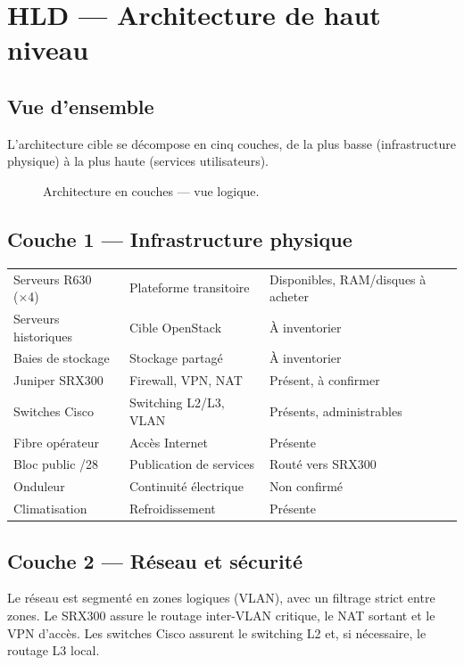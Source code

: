 \chapter{HLD — Architecture de haut niveau}
\label{chap:hld}

\section{Vue d'ensemble}
L'architecture cible se décompose en cinq couches, de la plus basse (infrastructure physique) à la plus haute (services utilisateurs).

\begin{figure}[H]
\centering\vspace{2pt}

\caption{Architecture en couches — vue logique.}
\label{fig:archi-layers}
\end{figure}

\section{Couche 1 — Infrastructure physique}
\begin{xltabular}{\textwidth}{@{}lXl@{}}
\toprule
{} &  &  \\
\midrule
\endhead
\bottomrule
\endfoot
\bottomrule
\endlastfoot
Serveurs R630 (×4) & Plateforme transitoire & Disponibles, RAM/disques à acheter \\
Serveurs historiques & Cible OpenStack & À inventorier \\
Baies de stockage & Stockage partagé & À inventorier \\
Juniper SRX300 & Firewall, VPN, NAT & Présent, à confirmer \\
Switches Cisco & Switching L2/L3, VLAN & Présents, administrables \\
Fibre opérateur & Accès Internet & Présente \\
Bloc public /28 & Publication de services & Routé vers SRX300 \\
Onduleur & Continuité électrique & Non confirmé \\
Climatisation & Refroidissement & Présente \\

\end{xltabular}

\section{Couche 2 — Réseau et sécurité}
Le réseau est segmenté en zones logiques (VLAN), avec un filtrage strict entre zones. Le SRX300 assure le routage inter-VLAN critique, le NAT sortant et le VPN d'accès. Les switches Cisco assurent le switching L2 et, si nécessaire, le routage L3 local.

